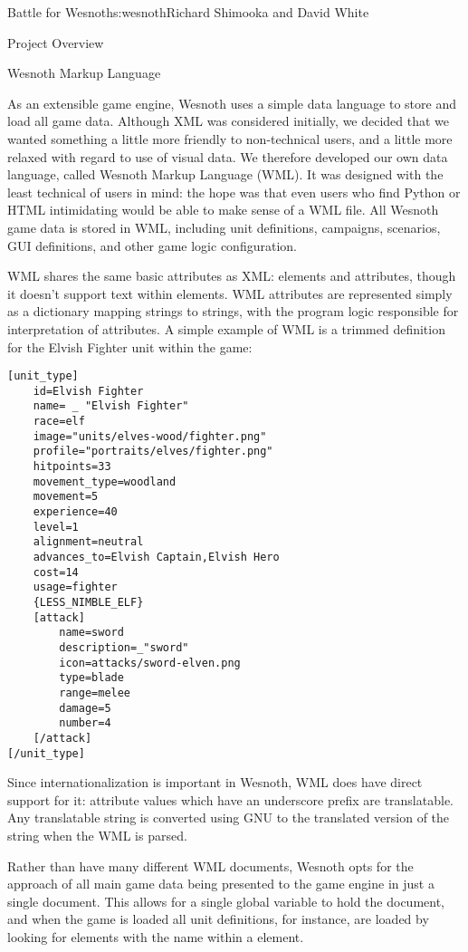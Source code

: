 \begin{aosachapter}{Battle for Wesnoth}{s:wesnoth}{Richard Shimooka and David White}
\begin{aosasect1}{Project Overview}
\end{aosasect1}

\begin{aosasect1}{Wesnoth Markup Language}

As an extensible game engine, Wesnoth uses a simple data language to
store and load all game data. Although XML was considered initially,
we decided that we wanted something a little more friendly to non-technical
users, and a little more relaxed with regard to use of visual data.
We therefore developed our own data language,
called Wesnoth Markup Language (WML). It was designed with the least
technical of users in mind: the hope was that even users who find
Python or HTML intimidating would be able to make sense of a WML
file. All Wesnoth game data is stored in WML, including unit
definitions, campaigns, scenarios, GUI definitions, and other game
logic configuration.

WML shares the same basic attributes as XML: elements and attributes,
though it doesn't support text within elements. WML attributes are
represented simply as a dictionary mapping strings to strings, with
the program logic responsible for interpretation of attributes. A
simple example of WML is a trimmed definition for the Elvish Fighter
unit within the game:

\begin{verbatim}
[unit_type]
    id=Elvish Fighter
    name= _ "Elvish Fighter"
    race=elf
    image="units/elves-wood/fighter.png"
    profile="portraits/elves/fighter.png"
    hitpoints=33
    movement_type=woodland
    movement=5
    experience=40
    level=1
    alignment=neutral
    advances_to=Elvish Captain,Elvish Hero
    cost=14
    usage=fighter
    {LESS_NIMBLE_ELF}
    [attack]
        name=sword
        description=_"sword"
        icon=attacks/sword-elven.png
        type=blade
        range=melee
        damage=5
        number=4
    [/attack]
[/unit_type]
\end{verbatim}

Since internationalization is important in Wesnoth, WML does have
direct support for it: attribute values which have an underscore
prefix are translatable. Any translatable string is converted using
GNU  to the translated version of the string when the
WML is parsed.

Rather than have many different WML documents, Wesnoth opts for the
approach of all main game data being presented to the game engine in
just a single document. This allows for a single global variable to
hold the document, and when the game is loaded all unit definitions,
for instance, are loaded by looking for elements with the name
 within a  element.


\end{aosasect1}
\end{aosachapter}
